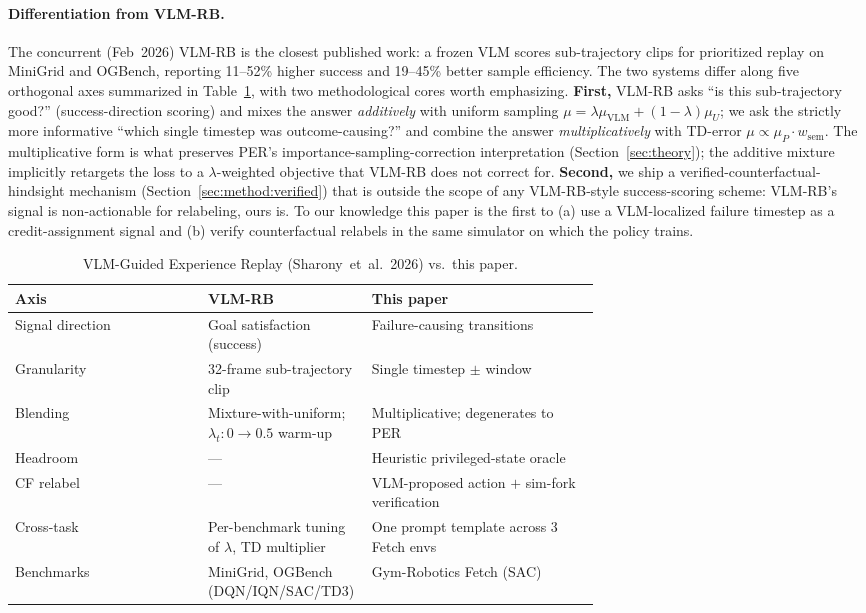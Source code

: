 \documentclass{article}
\begin{document}
\paragraph{Differentiation from VLM-RB.}
The concurrent (Feb~2026) VLM-RB \citep{sharony2026vlmrb} is the closest
published work: a frozen VLM scores sub-trajectory clips for prioritized
replay on MiniGrid and OGBench, reporting 11--52\% higher success and
19--45\% better sample efficiency. The two systems differ along five
orthogonal axes summarized in Table~\ref{tab:differentiation}, with two
methodological cores worth emphasizing. \textbf{First,} VLM-RB asks ``is this
sub-trajectory good?'' (success-direction scoring) and mixes the answer
\emph{additively} with uniform sampling
$\mu = \lambda \mu_{\text{VLM}} + (1-\lambda)\mu_U$; we ask the strictly
more informative ``which single timestep was outcome-causing?'' and combine
the answer \emph{multiplicatively} with TD-error
$\mu \propto \mu_P \cdot w_{\text{sem}}$. The multiplicative form is what
preserves PER's importance-sampling-correction interpretation
(Section~\ref{sec:theory}); the additive mixture implicitly retargets the
loss to a $\lambda$-weighted objective that VLM-RB does not correct for.
\textbf{Second,} we ship a verified-counterfactual-hindsight mechanism
(Section~\ref{sec:method:verified}) that is outside the scope of any
VLM-RB-style success-scoring scheme: VLM-RB's signal is non-actionable for
relabeling, ours is. To our knowledge this paper is the first to (a) use a
VLM-localized failure timestep as a credit-assignment signal and (b) verify
counterfactual relabels in the same simulator on which the policy trains.

\begin{table}[t]
  \centering
  \footnotesize
  \caption{VLM-Guided Experience Replay (Sharony~et~al.~2026) vs.\ this paper.}
  \label{tab:differentiation}
  \begin{tabular}{l p{0.29\linewidth} p{0.39\linewidth}}
    \toprule
    Axis & VLM-RB \citep{sharony2026vlmrb} & This paper \\
    \midrule
    Signal direction & Goal satisfaction (success) & Failure-causing transitions \\
    Granularity & 32-frame sub-trajectory clip & Single timestep $\pm$ window \\
    Blending & Mixture-with-uniform; $\lambda_t\!:\!0\!\to\!0.5$ warm-up & Multiplicative; degenerates to PER \\
    Headroom & --- & Heuristic privileged-state oracle \\
    CF relabel & --- & VLM-proposed action $+$ sim-fork verification \\
    Cross-task & Per-benchmark tuning of $\lambda$, TD multiplier & One prompt template across 3 Fetch envs \\
    Benchmarks & MiniGrid, OGBench (DQN/IQN/SAC/TD3) & Gym-Robotics Fetch (SAC) \\
    \bottomrule
  \end{tabular}
\end{table}
\end{document}
